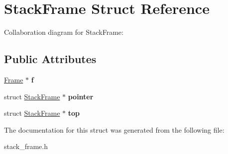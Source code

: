 \hypertarget{structStackFrame}{}\section{Stack\+Frame Struct Reference}
\label{structStackFrame}


Collaboration diagram for Stack\+Frame\+:
\subsection*{Public Attributes}
\begin{DoxyCompactItemize}
\item 
\hyperlink{structFrame}{Frame} $\ast$ {\bfseries f}\hypertarget{structStackFrame_a344a354f24d9c4b6c805cd0a029100b9}{}\label{structStackFrame_a344a354f24d9c4b6c805cd0a029100b9}

\item 
struct \hyperlink{structStackFrame}{Stack\+Frame} $\ast$ {\bfseries pointer}\hypertarget{structStackFrame_aae670075795a607599420fd8b5181292}{}\label{structStackFrame_aae670075795a607599420fd8b5181292}

\item 
struct \hyperlink{structStackFrame}{Stack\+Frame} $\ast$ {\bfseries top}\hypertarget{structStackFrame_a9f0df83101cacbe812d0d4b3c6e08494}{}\label{structStackFrame_a9f0df83101cacbe812d0d4b3c6e08494}

\end{DoxyCompactItemize}


The documentation for this struct was generated from the following file\+:\begin{DoxyCompactItemize}
\item 
stack\+\_\+frame.\+h\end{DoxyCompactItemize}
